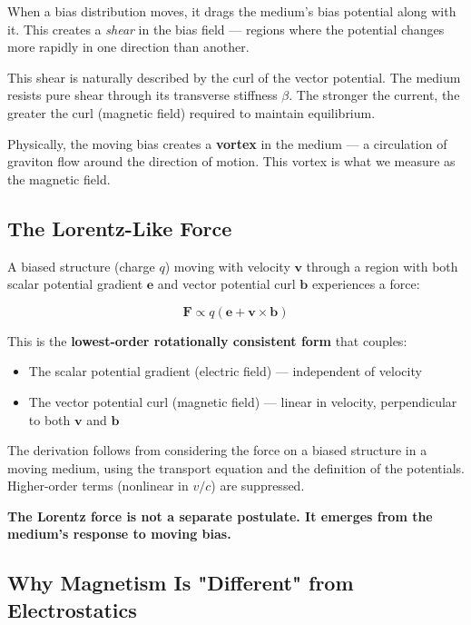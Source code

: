 \documentclass[12pt, a4paper]{article}
\begin{document}
When a bias distribution moves, it drags the medium's bias potential along with it. This creates a \textit{shear} in the bias field — regions where the potential changes more rapidly in one direction than another.

This shear is naturally described by the curl of the vector potential. The medium resists pure shear through its transverse stiffness \( \beta \). The stronger the current, the greater the curl (magnetic field) required to maintain equilibrium.

Physically, the moving bias creates a \textbf{vortex} in the medium — a circulation of graviton flow around the direction of motion. This vortex is what we measure as the magnetic field.

\subsection{The Lorentz-Like Force}
\label{subsec:lorentz_force}

A biased structure (charge \( q \)) moving with velocity \( \mathbf{v} \) through a region with both scalar potential gradient \( \mathbf{e} \) and vector potential curl \( \mathbf{b} \) experiences a force:

\[
\mathbf{F} \propto q \left( \mathbf{e} + \mathbf{v} \times \mathbf{b} \right)
\]

This is the \textbf{lowest-order rotationally consistent form} that couples:
\begin{itemize}
    \item The scalar potential gradient (electric field) — independent of velocity
    \item The vector potential curl (magnetic field) — linear in velocity, perpendicular to both \( \mathbf{v} \) and \( \mathbf{b} \)
\end{itemize}

The derivation follows from considering the force on a biased structure in a moving medium, using the transport equation and the definition of the potentials. Higher-order terms (nonlinear in \( v/c \)) are suppressed.

\textbf{The Lorentz force is not a separate postulate. It emerges from the medium's response to moving bias.}

\subsection{Why Magnetism Is "Different" from Electrostatics}
\label{subsec:magnetism_vs_electrostatics}
\end{document}
